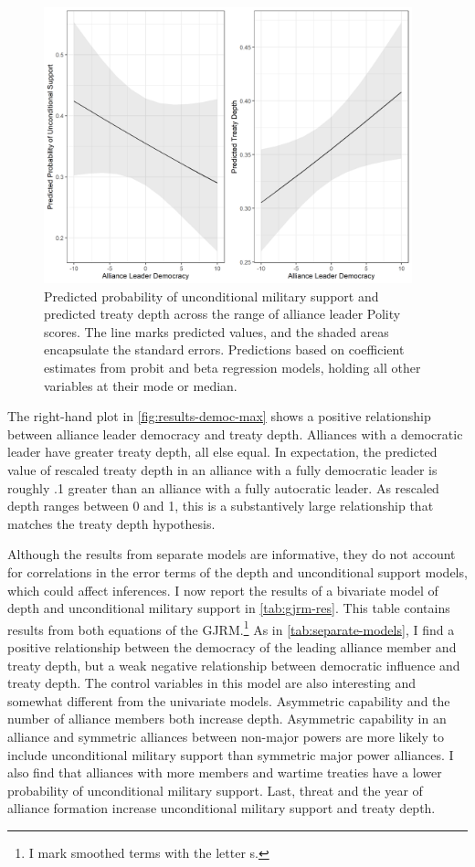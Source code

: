 \documentclass[12pt]{article}
\begin{document}
\begin{figure}[hbtp]
\centering
\includegraphics[width=0.95\textwidth]{../figures/results-democ-max.png}
\caption{Predicted probability of unconditional military support and predicted treaty depth across the range of alliance leader Polity scores. The line marks predicted values, and the shaded areas encapsulate the standard errors. Predictions based on coefficient estimates from probit and beta regression models, holding all other variables at their mode or median.}
\label{fig:results-democ-max}
\end{figure}


The right-hand plot in \autoref{fig:results-democ-max} shows a positive relationship between alliance leader democracy and treaty depth.
Alliances with a democratic leader have greater treaty depth, all else equal. 
In expectation, the predicted value of rescaled treaty depth in an alliance with a fully democratic leader is roughly .1 greater than an alliance with a fully autocratic leader. 
As rescaled depth ranges between 0 and 1, this is a substantively large relationship that matches the treaty depth hypothesis.


Although the results from separate models are informative, they do not account for correlations in the error terms of the depth and unconditional support models, which could affect inferences. 
I now report the results of a bivariate model of depth and unconditional military support in \autoref{tab:gjrm-res}. 
This table contains results from both equations of the GJRM.\footnote{I mark smoothed terms with the letter s.}
As in \autoref{tab:separate-models}, I find a positive relationship between the democracy of the leading alliance member and treaty depth, but a weak negative relationship between democratic influence and treaty depth.  
The control variables in this model are also interesting and somewhat different from the univariate models.  
Asymmetric capability and the number of alliance members both increase depth. 
Asymmetric capability in an alliance and symmetric alliances between non-major powers are more likely to include unconditional military support than symmetric major power alliances. 
I also find that alliances with more members and wartime treaties have a lower probability of unconditional military support. 
Last, threat and the year of alliance formation increase unconditional military support and treaty depth. 
\end{document}
